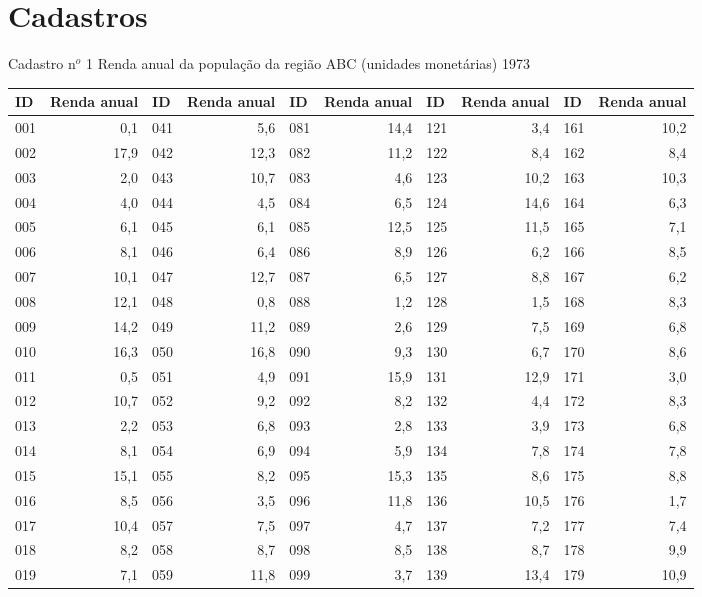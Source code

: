 \part{Cadastros}

Cadastro n$^o$ 1
Renda anual da população da região ABC (unidades monetárias)
1973
\begin{table}[!htb]
  \begingroup
  \fontsize{8pt}{8pt}\selectfont
\centering
\begin{tabular}{lrlrlrlrlr}
ID & Renda anual & ID & Renda anual & ID & Renda anual & ID & Renda anual & ID & Renda anual  \\
\hline 
001 & 0,1 & 041 & 5,6 & 081 & 14,4 & 121 & 3,4 & 161 & 10,2  \\
002 & 17,9 & 042 & 12,3 & 082 & 11,2 & 122 & 8,4 & 162 & 8,4  \\
003 & 2,0 & 043 & 10,7 & 083 & 4,6 & 123 & 10,2 & 163 & 10,3  \\
004 & 4,0 & 044 & 4,5 & 084 & 6,5 & 124 & 14,6 & 164 & 6,3  \\
005 & 6,1 & 045 & 6,1 & 085 & 12,5 & 125 & 11,5 & 165 & 7,1  \\
006 & 8,1 & 046 & 6,4 & 086 & 8,9 & 126 & 6,2 & 166 & 8,5 \\
007 & 10,1 & 047 & 12,7 & 087 & 6,5 & 127 & 8,8 & 167 & 6,2  \\
008 & 12,1 & 048 & 0,8 & 088 & 1,2 & 128 & 1,5 & 168 & 8,3  \\
009 & 14,2 & 049 & 11,2 & 089 & 2,6 & 129 & 7,5 & 169 & 6,8 \\
010 & 16,3 & 050 & 16,8 & 090 & 9,3 & 130 & 6,7 & 170 & 8,6  \\
011 & 0,5 & 051 & 4,9 & 091 & 15,9 & 131 & 12,9 & 171 & 3,0 \\
012 & 10,7 & 052 & 9,2 & 092 & 8,2 & 132 & 4,4 & 172 & 8,3  \\
013 & 2,2 & 053 & 6,8 & 093 & 2,8 & 133 & 3,9 & 173 & 6,8  \\
014 & 8,1 & 054 & 6,9 & 094 & 5,9 & 134 & 7,8 & 174 & 7,8  \\
015 & 15,1 & 055 & 8,2 & 095 & 15,3 & 135 & 8,6 & 175 & 8,8  \\
016 & 8,5 & 056 & 3,5 & 096 & 11,8 & 136 & 10,5 & 176 & 1,7  \\
017 & 10,4 & 057 & 7,5 & 097 & 4,7 & 137 & 7,2 & 177 & 7,4 \\
018 & 8,2 & 058 & 8,7 & 098 & 8,5 & 138 & 8,7 & 178 & 9,9  \\
019 & 7,1 & 059 & 11,8 & 099 & 3,7 & 139 & 13,4 & 179 & 10,9  \\

\end{tabular}
\end{table}
